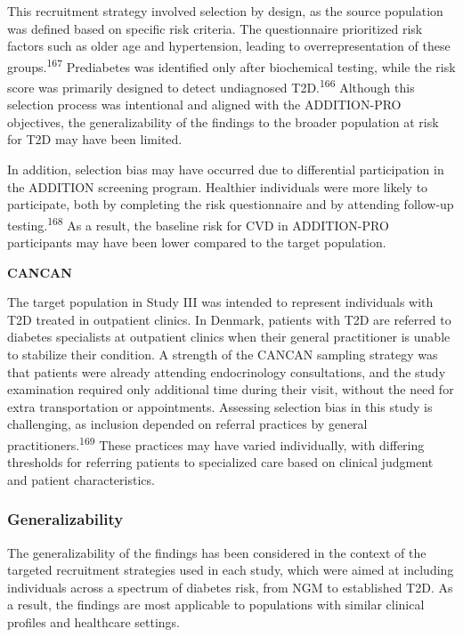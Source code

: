 \documentclass[
  a4paper,
  headsepline=true,
  open=left]{scrbook}
\begin{document}
This recruitment strategy involved selection by design, as the source
population was defined based on specific risk criteria. The
questionnaire prioritized risk factors such as older age and
hypertension, leading to overrepresentation of these
groups.\textsuperscript{167} Prediabetes was identified only after
biochemical testing, while the risk score was primarily designed to
detect undiagnosed T2D.\textsuperscript{166} Although this selection
process was intentional and aligned with the ADDITION-PRO objectives,
the generalizability of the findings to the broader population at risk
for T2D may have been limited.

In addition, selection bias may have occurred due to differential
participation in the ADDITION screening program. Healthier individuals
were more likely to participate, both by completing the risk
questionnaire and by attending follow-up testing.\textsuperscript{168}
As a result, the baseline risk for CVD in ADDITION-PRO participants may
have been lower compared to the target population.

\textbf{CANCAN}

The target population in Study III was intended to represent individuals
with T2D treated in outpatient clinics. In Denmark, patients with T2D
are referred to diabetes specialists at outpatient clinics when their
general practitioner is unable to stabilize their condition. A strength
of the CANCAN sampling strategy was that patients were already attending
endocrinology consultations, and the study examination required only
additional time during their visit, without the need for extra
transportation or appointments. Assessing selection bias in this study
is challenging, as inclusion depended on referral practices by general
practitioners.\textsuperscript{169} These practices may have varied
individually, with differing thresholds for referring patients to
specialized care based on clinical judgment and patient characteristics.

\hypertarget{generalizability}{%
\subsubsection{Generalizability}\label{generalizability}}

The generalizability of the findings has been considered in the context
of the targeted recruitment strategies used in each study, which were
aimed at including individuals across a spectrum of diabetes risk, from
NGM to established T2D. As a result, the findings are most applicable to
populations with similar clinical profiles and healthcare settings.
\end{document}
